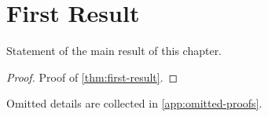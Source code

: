 \chapter{First Result}
\label{ch:first-result}

\begin{theorem}
\label{thm:first-result}
Statement of the main result of this chapter.
\end{theorem}

\begin{proof}
Proof of \cref{thm:first-result}.
\end{proof}

Omitted details are collected in \cref{app:omitted-proofs}.

%
%
